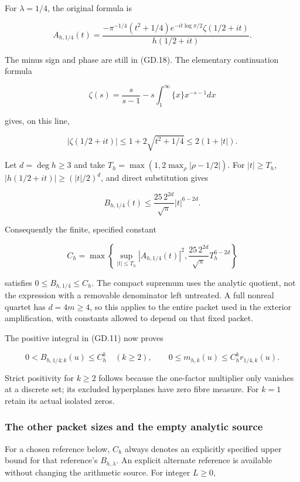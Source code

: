 For \(\lambda=1/4\), the original formula is

\[
A_{h,1/4}(t)=
\frac{-\pi^{-1/4}(t^2+1/4)e^{-it\log\pi/2}\zeta(1/2+it)}{h(1/2+it)}.
                                                                    \tag{GD.20}
\]

The minus sign and phase are still in (GD.18). The elementary continuation
formula

\[
\zeta(s)=\frac{s}{s-1}-s\int_1^\infty\{x\}x^{-s-1}dx
\]

gives, on this line,

\[
|\zeta(1/2+it)|\le1+2\sqrt{t^2+1/4}\le2(1+|t|).
\]

Let \(d=\deg h\ge3\) and take \(T_h=\max(1,2\max_\rho|\rho-1/2|)\). For
\(|t|\ge T_h\), \(|h(1/2+it)|\ge(|t|/2)^d\), and direct substitution
gives

\[
B_{h,1/4}(t)\le\frac{25\,2^{2d}}{\sqrt\pi}|t|^{6-2d}.
\]

Consequently the finite, specified constant

\[
C_h=\max\left\{
\sup_{|t|\le T_h}|A_{h,1/4}(t)|^2,
\frac{25\,2^{2d}}{\sqrt\pi}T_h^{6-2d}
\right\}
\]

satisfies \(0\le B_{h,1/4}\le C_h\). The compact supremum uses the
analytic quotient, not the expression with a removable denominator left
untreated. A full nonreal quartet has \(d=4m\ge4\), so this applies to
the entire packet used in the exterior amplification, with constants
allowed to depend on that fixed packet.

The positive integral in (GD.11) now proves

\[
\boxed{
0<B_{h,1/4;k}(u)\le C_h^k\quad(k\ge2),\qquad
0\le m_{h,k}(u)\le C_h^k r_{1/4,k}(u).
}                                                                   \tag{GD.21}
\]

Strict positivity for \(k\ge2\) follows because the one-factor
multiplier only vanishes at a discrete set; its excluded hyperplanes
have zero fibre measure. For \(k=1\) retain its actual isolated zeros.

\subsubsection{The other packet sizes and the empty analytic
source}\label{gammad-the-other-packet-sizes-and-the-empty-analytic-source}

For a chosen reference below, \(C_h\) always denotes an explicitly
specified upper bound for that reference's \(B_{h,\lambda}\). An
explicit alternate reference is available without changing the
arithmetic source. For integer \(L\ge0\),

